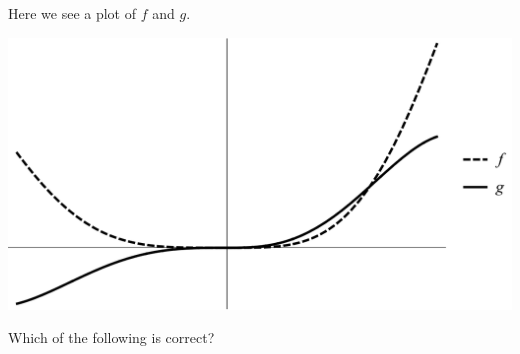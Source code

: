 \documentclass{ximera}
\author{Bart Snapp}
\begin{document}
\begin{exercise}
Here we see a plot of $f$ and $g$. 
\begin{image}
\includegraphics[width=.5\textwidth]{graphFandG2.png}
\end{image}
Which of the following is correct?
\begin{multipleChoice}
\end{multipleChoice}
\end{exercise}
\end{document}
